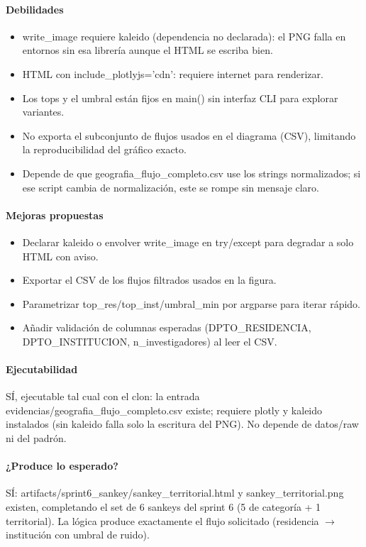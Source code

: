 \paragraph{Debilidades}
\begin{itemize}
  \item write\_image requiere kaleido (dependencia no declarada): el PNG falla en entornos sin esa librería aunque el HTML se escriba bien.
  \item HTML con include\_plotlyjs='cdn': requiere internet para renderizar.
  \item Los tops y el umbral están fijos en main() sin interfaz CLI para explorar variantes.
  \item No exporta el subconjunto de flujos usados en el diagrama (CSV), limitando la reproducibilidad del gráfico exacto.
  \item Depende de que geografia\_flujo\_completo.csv use los strings normalizados; si ese script cambia de normalización, este se rompe sin mensaje claro.
\end{itemize}

\paragraph{Mejoras propuestas}
\begin{itemize}
  \item Declarar kaleido o envolver write\_image en try/except para degradar a solo HTML con aviso.
  \item Exportar el CSV de los flujos filtrados usados en la figura.
  \item Parametrizar top\_res/top\_inst/umbral\_min por argparse para iterar rápido.
  \item Añadir validación de columnas esperadas (DPTO\_RESIDENCIA, DPTO\_INSTITUCION, n\_investigadores) al leer el CSV.
\end{itemize}

\paragraph{Ejecutabilidad}
SÍ, ejecutable tal cual con el clon: la entrada evidencias/geografia\_flujo\_completo.csv existe; requiere plotly y kaleido instalados (sin kaleido falla solo la escritura del PNG). No depende de datos/raw ni del padrón.

\paragraph{¿Produce lo esperado?}
SÍ: artifacts/sprint6\_sankey/sankey\_territorial.html y sankey\_territorial.png existen, completando el set de 6 sankeys del sprint 6 (5 de categoría + 1 territorial). La lógica produce exactamente el flujo solicitado (residencia $\rightarrow$ institución con umbral de ruido).


